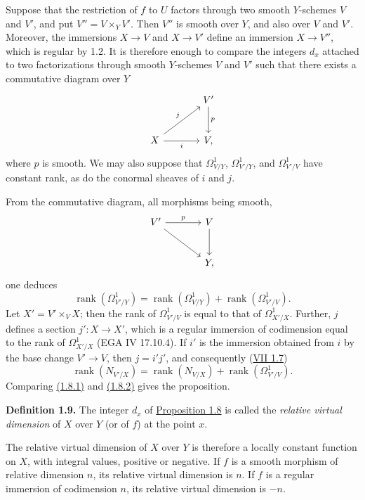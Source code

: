 Suppose that the restriction of $f$ to $U$ factors through two smooth $Y$-schemes $V$ and $V'$, and put $V''=V\times_Y V'$. Then $V''$ is smooth over $Y$, and also over $V$ and $V'$. Moreover, the immersions $X\to V$ and $X\to V'$ define an immersion $X\to V''$, which is regular by 1.2. It is therefore enough to compare the integers $d_x$ attached to two factorizations through smooth $Y$-schemes $V$ and $V'$ such that there exists a commutative diagram over $Y$
\[
\begin{tikzcd}[column sep=large,row sep=large]
& V' \arrow[d,"p"]\\
X \arrow[ur,"j"] \arrow[r,"i"'] & V,
\end{tikzcd}
\]
where $p$ is smooth. We may also suppose that $\Omega^1_{V/Y}$, $\Omega^1_{V'/Y}$, and $\Omega^1_{V'/V}$ have constant rank, as do the conormal sheaves of $i$ and $j$.

From the commutative diagram, all morphisms being smooth,
\[
\begin{tikzcd}[column sep=large,row sep=large]
V' \arrow[r,"p"] \arrow[dr] & V \arrow[d]\\
& Y,
\end{tikzcd}
\]
one deduces
\begin{equation}\tag{1.8.1}
\operatorname{rank}(\Omega^1_{V'/Y})=
\operatorname{rank}(\Omega^1_{V/Y})+
\operatorname{rank}(\Omega^1_{V'/V}).
\end{equation}
Let $X'=V'\times_V X$; then the rank of $\Omega^1_{V'/V}$ is equal to that of $\Omega^1_{X'/X}$. Further, $j$ defines a section $j':X\to X'$, which is a regular immersion of codimension equal to the rank of $\Omega^1_{X'/X}$ (EGA IV 17.10.4). If $i'$ is the immersion obtained from $i$ by the base change $V'\to V$, then $j=i'j'$, and consequently (\hyperlink{sga6.e07.prop.1-7}{VII 1.7})
\begin{equation}\tag{1.8.2}
\operatorname{rank}(N_{V'/X})=
\operatorname{rank}(N_{V/X})+
\operatorname{rank}(\Omega^1_{V'/V}).
\end{equation}
Comparing \hyperlink{sga6.e08.eq.1-8-1}{(1.8.1)} and \hyperlink{sga6.e08.eq.1-8-2}{(1.8.2)} gives the proposition.

\textbf{Definition 1.9.} The integer $d_x$ of \hyperlink{sga6.e08.prop.1-8}{Proposition 1.8} is called the \emph{relative virtual dimension} of $X$ over $Y$ (or of $f$) at the point $x$.

The relative virtual dimension of $X$ over $Y$ is therefore a locally constant function on $X$, with integral values, positive or negative. If $f$ is a smooth morphism of relative dimension $n$, its relative virtual dimension is $n$. If $f$ is a regular immersion of codimension $n$, its relative virtual dimension is $-n$.


